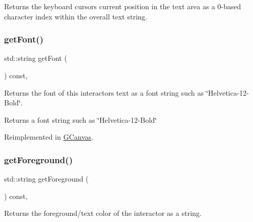 Returns the keyboard cursor\textquotesingle{}s current position in the text area as a 0-\/based character index within the overall text string. 

\mbox{\label{classsgl_1_1GInteractor_a894a5502900794eeb27d084c21f1d77d}} 
\subsubsection{\texorpdfstring{get\+Font()}{getFont()}}
{\footnotesize\ttfamily std\+::string get\+Font (\begin{DoxyParamCaption}{ }\end{DoxyParamCaption}) const\hspace{0.3cm}{\ttfamily [virtual]}, {\ttfamily [inherited]}}



Returns the font of this interactor\textquotesingle{}s text as a font string such as \char`\"{}\+Helvetica-\/12-\/\+Bold\char`\"{}. 

\begin{DoxyReturn}{Returns}
a font string such as \char`\"{}\+Helvetica-\/12-\/\+Bold\char`\"{} 
\end{DoxyReturn}


Reimplemented in \mbox{\hyperlink{classsgl_1_1GCanvas_aa0829769ac6325b5c58d27c8e363cb78}{G\+Canvas}}.

\mbox{\label{classsgl_1_1GInteractor_a4fa2d8b0192a3a5b4af4bbfe71194d03}} 
\subsubsection{\texorpdfstring{get\+Foreground()}{getForeground()}}
{\footnotesize\ttfamily std\+::string get\+Foreground (\begin{DoxyParamCaption}{ }\end{DoxyParamCaption}) const\hspace{0.3cm}{\ttfamily [virtual]}, {\ttfamily [inherited]}}



Returns the foreground/text color of the interactor as a string. 

